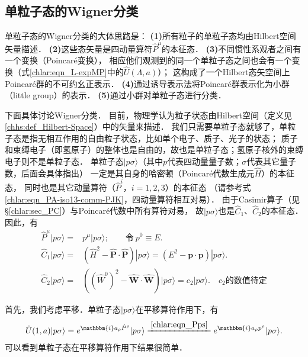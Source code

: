 \subsection{单粒子态的Wigner分类}\label{chlar:sec_wigner-class}

单粒子态的Wigner分类的大体思路是\cite[\S 2.5]{weinberg_vol1}\cite[\S 10.4]{tung-1985}：
{\bfseries (1)}所有粒子的单粒子态均由Hilbert空间矢量描述．
{\bfseries (2)}这些态矢量是四动量算符$\hat{P}^\mu$的本征态．
{\bfseries (3)}不同惯性系观者之间有一个变换（Poincar\'e变换），
相应他们观测到的同一个单粒子态之间也会有一个变换（式\eqref{chlar:eqn_L-expMP}中的$\hat{U}(\Lambda,a)$）；
这构成了一个Hilbert态矢空间上Poincar\'e群的不可约幺正表示．
{\bfseries (4)}通过诱导表示法将Poincar\'e群表示化为{\kaishu 小群}（little group）的表示．
{\bfseries (5)}通过小群对单粒子态进行分类．

下面具体讨论Wigner分类．
目前，物理学认为粒子状态由Hilbert空间（定义见\ref{chhs:def_Hilbert-Space}）中的矢量来描述．
我们只需要单粒子态就够了，单粒子态是指无相互作用的自由粒子状态，比如单个电子、质子、光子的状态；
质子和束缚电子（即氢原子）的整体也是自由的，故也是单粒子态；氢原子核外的束缚电子则不是单粒子态．
单粒子态$|p\sigma\rangle$（其中$p$代表四动量量子数；$\sigma$代表其它量子数，后面会具体指出）
一定是其自身的哈密顿（Poincar\'e代数生成元$\hat{H}$）的本征态，
同时也是其它动量算符（$\hat{P}^i$，$i=1,2,3$）的本征态
（请参考式\eqref{chlar:eqn_PA-iso13-comm-PJK}，四动量算符相互对易）．
由于Casimir算子（见\S\ref{chlar:sec_PC}）与Poincar\'e代数中所有算符对易，
故$|p\sigma\rangle$也是$\hat{C}_1$、$\hat{C}_2$的本征态．因此，有
\begin{align}
	\hat{P}^\mu |p\sigma\rangle =& p^\mu |p\sigma\rangle;\qquad \text{令}\ p^0 \equiv E . \label{chlar:eqn_Pps}\\
	\hat{C}_1 |p\sigma\rangle = & (\hat{H}^2 - \boldsymbol{\hat{P}}\cdot \boldsymbol{\hat{P}}) |p\sigma\rangle
	= (E^2 -\boldsymbol{p}\cdot \boldsymbol{p}) |p\sigma\rangle . \label{chlar:eqn_C1ps} \\
	\hat{C}_2 |p\sigma\rangle = & \left(\left(\widehat{W}^0\right)^2 - \boldsymbol{\widehat{W}}
	\cdot \boldsymbol{\widehat{W}}\right) |p\sigma\rangle
	= c_2 |p\sigma\rangle . \quad c_2\text{的数值待定}  \label{chlar:eqn_C2ps}
\end{align}




首先，我们考虑平移．单粒子态$|p\sigma\rangle$在平移算符作用下，有
\begin{align}
	\hat{U}(1,a) |p\sigma\rangle = e^{\mathbbm{i}a_\rho \hat{P}^\rho} |p\sigma\rangle
	\xlongequal{\ref{chlar:eqn_Pps}} e^{\mathbbm{i}a_\rho p^\rho} |p\sigma\rangle .
\end{align}
可以看到单粒子态在平移算符作用下结果很简单．

